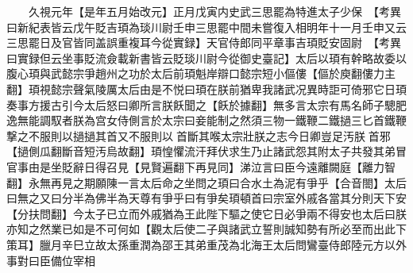 　　久視元年【是年五月始改元】正月戊寅内史武三思罷為特進太子少保　【考異曰新紀表皆云戊午貶吉頊為琰川尉壬申三思罷中間未嘗復入相明年十一月壬申又云三思罷日及官皆同盖誤重複耳今從實録】天官侍郎同平章事吉頊貶安固尉　【考異曰實録但云坐事貶流僉載新書皆云貶琰川尉今從御史臺記】太后以頊有幹略故委以腹心頊與武懿宗爭趙州之功於太后前頊魁岸辯口懿宗短小傴僂【傴於庾翻僂力主翻】頊視懿宗聲氣陵厲太后由是不悦曰頊在朕前猶卑我諸武况異時詎可倚邪它日頊奏事方援古引今太后怒曰卿所言朕飫聞之【飫於據翻】無多言太宗有馬名師子驄肥逸無能調馭者朕為宫女侍側言於太宗曰妾能制之然須三物一鐵鞭二鐵撾三匕首鐵鞭撃之不服則以撾撾其首又不服則以首斷其喉太宗壯朕之志今日卿豈足汚朕首邪【撾側瓜翻斷音短汚烏故翻】頊惶懼流汗拜伏求生乃止諸武怨其附太子共發其弟冒官事由是坐貶辭日得召見【見賢遍翻下再見同】涕泣言曰臣今遠離闕庭【離力智翻】永無再見之期願陳一言太后命之坐問之頊曰合水土為泥有爭乎【合音閤】太后曰無之又曰分半為佛半為天尊有爭乎曰有爭矣頊頓首曰宗室外戚各當其分則天下安【分扶問翻】今太子已立而外戚猶為王此陛下驅之使它日必爭兩不得安也太后曰朕亦知之然業已如是不可何如【觀太后使二子與諸武立誓則誠知勢有所必至而出此下策耳】臘月辛巳立故太孫重潤為邵王其弟重茂為北海王太后問鸞臺侍郎陸元方以外事對曰臣備位宰相

